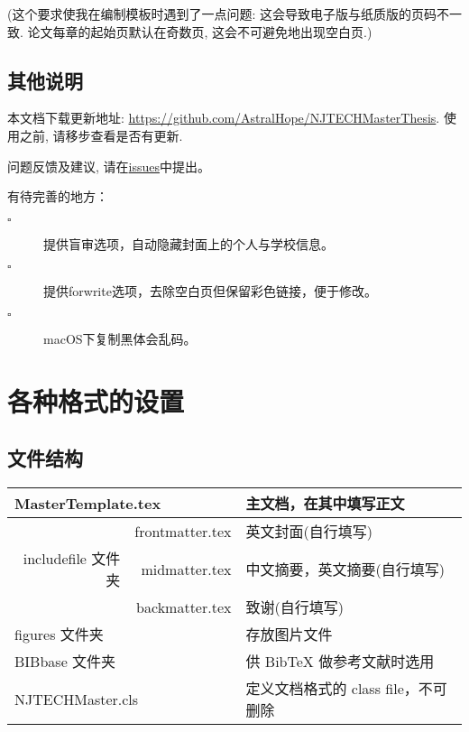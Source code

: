 \documentclass[smd,entitle,forlib,AutoFakeBold]{NJTECHMaster}
\begin{document}
({\kaishu 这个要求使我在编制模板时遇到了一点问题: 这会导致电子版与纸质版的页码不一致.  论文每章的起始页默认在奇数页, 这会不可避免地出现空白页.})

\section{其他说明}

本文档下载更新地址: \url{https://github.com/AstralHope/NJTECHMasterThesis}. 使用之前, 请移步查看是否有更新.

问题反馈及建议, 请在\href{https://github.com/AstralHope/NJTECHMasterThesis/issues}{issues}中提出。

有待完善的地方：

\begin{description}
	
	\item[$ \square  $]  提供盲审选项，自动隐藏封面上的个人与学校信息。
	
	\item[$ \square  $]  提供forwrite选项，去除空白页但保留彩色链接，便于修改。
	
	\item[$ \square  $]  macOS下复制黑体会乱码。
	
\end{description}

\chapter{各种格式的设置}

\section{文件结构}
\begin{table}[ht]\centering
	\begin{tabular}{r|r|l}
		\hline\hline
		\multicolumn{2}{l|}{MasterTemplate.tex }  &  主文档，在其中填写正文\\\hline
		&frontmatter.tex&  英文封面\hfill ({\kaishu 自行填写}) \\\cline{2-3}
		includefile 文件夹  & midmatter.tex  &  中文摘要，英文摘要\hfill  ({\kaishu 自行填写}) \\\cline{2-3}
		& backmatter.tex &  致谢\hfill  ({\kaishu 自行填写}) \\\hline
		\multicolumn{2}{l|}{figures 文件夹} &  存放图片文件\\\hline
		\multicolumn{2}{l|}{BIBbase 文件夹} &   供 BibTeX{} 做参考文献时选用\\
		\hline
		\multicolumn{2}{l|}{NJTECHMaster.cls} &  定义文档格式的 class file，不可删除\\ \hline \hline
	\end{tabular}
\end{table}
\end{document}
